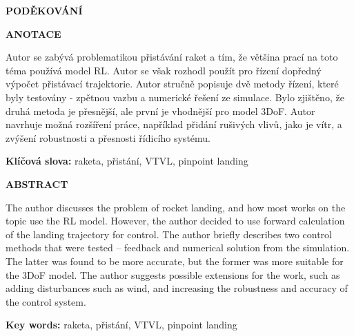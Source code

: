 \documentclass[12pt]{article}
\begin{document}
    \vspace*{3cm}

    \begin{center}
        \Large{\textbf{PODĚKOVÁNÍ}}
    \end{center}


    \vfill
    \pagebreak


    \hspace{0pt}
    \vfill

    \begin{center}
        \Large
        \textbf{ANOTACE}
    \end{center}

    \vspace*{0.5cm}

    \noindent Autor se zabývá problematikou přistávání raket a tím, že většina prací na toto téma používá model RL. Autor se však rozhodl použít pro řízení dopředný výpočet přistávací trajektorie. Autor stručně popisuje dvě metody řízení, které byly testovány - zpětnou vazbu a numerické řešení ze simulace. Bylo zjištěno, že druhá metoda je přesnější, ale první je vhodnější pro model 3DoF. Autor navrhuje možná rozšíření práce, například přidání rušivých vlivů, jako je vítr, a zvýšení robustnosti a přesnosti řídicího systému.

    \noindent\textbf{Klíčová slova:} raketa, přistání, VTVL, pinpoint landing

    \vspace*{3cm}

    \begin{center}
        \Large
        \textbf{ABSTRACT}
    \end{center}

    \vspace*{0.5cm}

    \noindent The author discusses the problem of rocket landing, and how most works on the topic use the RL model. However, the author decided to use forward calculation of the landing trajectory for control. The author briefly describes two control methods that were tested – feedback and numerical solution from the simulation. The latter was found to be more accurate, but the former was more suitable for the 3DoF model. The author suggests possible extensions for the work, such as adding disturbances such as wind, and increasing the robustness and accuracy of the control system.

    \noindent\textbf{Key words:} raketa, přistání, VTVL, pinpoint landing
\end{document}
